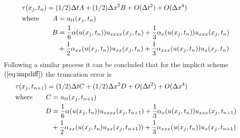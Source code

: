 \documentclass[11pt]{article}
\newcommand{\D}{\Delta}
\newcommand{\al}{\mathrm{\alpha}}
\begin{document}
\begin{appendices}
\begin{equation}
\label{eq:exptru2}
\begin{split}
&\tau(x_j,t_n) = (1/2)\D{t}A + (1/2)\D{x^2}B + O(\D{t^2}) + O(\D{x^4})\\ 
&\begin{aligned}
\text{where\qquad}
A &= u_{tt}(x_j,t_n)\\
B &= \frac{ 1 }{6 }\al(u(x_j,t_n))u_{xxxx}(x_j,t_n)+ \frac{1}{3} \al_x(u(x_j,t_n ))u_{xxx}(x_j,t_n ) \\ &+\frac{1}{2}\al_{xx}(u(x_j,t_n))u_{xx}(x_j,t_n) +\frac{1}{3}\al_{xxx}(u(x_j,t_n))u_{x}(x_j,t_n)
\end{aligned}
\end{split}
\end{equation}
Following a similar process it can be concluded that for the implicit scheme $(\ref{eq:impdiff})$ the truncation error is
\begin{equation}
\label{eq:imptru}
    \begin{split}
        &\tau(x_j,t_{n+1}) = (1/2)\D{t}C + (1/2)\D{x^2}D  +  O(\D{t^2}) + O(\D{x^4})\\ 
        &\begin{aligned}
            \text{where\qquad}
            C &=  u_{tt}(x_j,t_{n+1})\\
            D &= \frac{ 1 }{6 }\al(u(x_j,t_n))u_{xxxx}(x_j,t_{n+1})+ \frac{1}{3} \al_x(u(x_j,t_{n} ))u_{xxx}(x_j,t_{n+1} ) \\ &+\frac{1}{2}\al_{xx}(u(x_j,t_{n})u_{xx}(x_j,t_{n+1})) +\frac{1}{3}\al_{xxx}(u(x_j,t_n))u_{x}(x_j,t_{n+1})
        \end{aligned}
    \end{split}
\end{equation}
\end{appendices}


\end{document}
